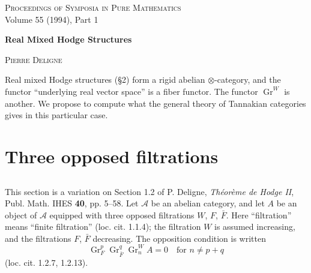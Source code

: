 \documentclass[12pt,a4paper]{article}
\theoremstyle{plain}
\theoremstyle{definition}
\DeclareMathOperator{\Gr}{Gr}
\newcommand{\A}{\mathcal{A}}
\begin{document}
\begin{center}
\small\textsc{Proceedings of Symposia in Pure Mathematics}\\
\small Volume 55 (1994), Part 1
\end{center}

\vspace{1cm}

\begin{center}
\Large\textbf{Real Mixed Hodge Structures}
\end{center}

\begin{flushright}
\textsc{Pierre Deligne}
\end{flushright}

\vspace{0.5cm}

Real mixed Hodge structures (\S2) form a rigid abelian $\otimes$-category, and the functor ``underlying real vector space'' is a fiber functor. The functor $\Gr^W$ is another. We propose to compute what the general theory of Tannakian categories gives in this particular case.

\section{Three opposed filtrations}

\subsection{}

This section is a variation on Section 1.2 of P. Deligne, \textit{Th\'eor\`eme de Hodge II}, Publ. Math. IHES \textbf{40}, pp. 5--58. Let $\A$ be an abelian category, and let $A$ be an object of $\A$ equipped with three opposed filtrations $W$, $F$, $\bar F$. Here ``filtration'' means ``finite filtration'' (loc. cit. 1.1.4); the filtration $W$ is assumed increasing, and the filtrations $F$, $\bar F$ decreasing. The opposition condition is written
\[
\Gr_F^p\Gr_{\bar F}^q\Gr_n^W A=0\quad\text{for }n\ne p+q
\]
(loc. cit. 1.2.7, 1.2.13).
\end{document}
